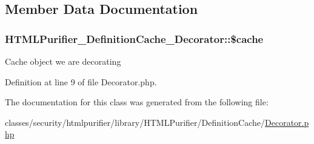\subsection{Member Data Documentation}
\hypertarget{classHTMLPurifier__DefinitionCache__Decorator_a200d4c7658023111e322e6a027ca9846}{
\subsubsection[{\$cache}]{\setlength{\rightskip}{0pt plus 5cm}H\+T\+M\+L\+Purifier\+\_\+\+Definition\+Cache\+\_\+\+Decorator\+::\$cache}}\label{classHTMLPurifier__DefinitionCache__Decorator_a200d4c7658023111e322e6a027ca9846}
Cache object we are decorating 

Definition at line 9 of file Decorator.\+php.



The documentation for this class was generated from the following file\+:\begin{DoxyCompactItemize}
\item 
classes/security/htmlpurifier/library/\+H\+T\+M\+L\+Purifier/\+Definition\+Cache/\hyperlink{Decorator_8php}{Decorator.\+php}\end{DoxyCompactItemize}
